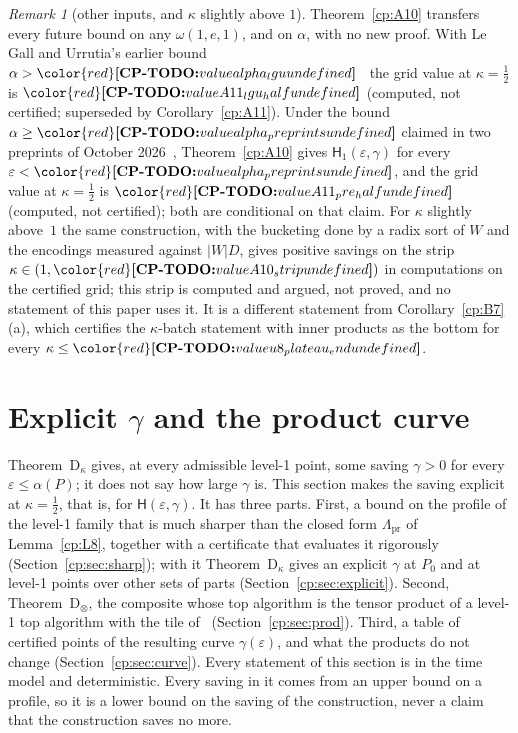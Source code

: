 \documentclass[11pt]{article}
\makeatletter
\theoremstyle{definition}
\theoremstyle{remark}
\newtheorem{remark}[theorem]{Remark}
\DeclareRobustCommand{\CPTODO}[1]{{\color{red}\textbf{[CP-TODO:} #1\textbf{]}}}
\providecommand{\eps}{\varepsilon}
\newcommand{\abs}[1]{\lvert #1\rvert}
\newcommand{\Hyp}{\mathsf{H}}                 %
\newcommand{\Hypk}[1]{\mathsf{H}_{#1}}        %
\newcommand{\Lampr}{\Lambda_{\mathrm{pr}}}    %
\newcommand{\ThmDk}{Theorem~D\texorpdfstring{\ensuremath{_\kappa}}{\_kappa}}     %
\newcommand{\ThmDprod}{Theorem~D\texorpdfstring{\ensuremath{_\otimes}}{\_x}}     %
\newcommand{\Pzero}{P_0}                      %
\newcommand{\cpv}[1]{\ifcsname cpv@#1\endcsname\csname cpv@#1\endcsname\else\CPTODO{value #1 undefined}\fi}
\makeatother
\begin{document}
\begin{remark}[other inputs, and $\kappa$ slightly above $1$]\label{cp:A11:rem}
Theorem~\ref{cp:A10} transfers every future bound on any $\omega(1,e,1)$, and on $\alpha$, with no new proof. With Le Gall and Urrutia's earlier bound $\alpha>\cpv{alpha_lgu}$~\cite{LGU18} the grid value at $\kappa=\frac12$ is $\cpv{A11_lgu_half}$ (computed, not certified; superseded by Corollary~\ref{cp:A11}). Under the bound $\alpha\ge\cpv{alpha_preprints}$ claimed in two preprints of October 2026~\cite{AvdBZ26,Uzn26}, Theorem~\ref{cp:A10} gives $\Hypk1(\eps,\gamma)$ for every $\eps<\cpv{alpha_preprints}$, and the grid value at $\kappa=\frac12$ is $\cpv{A11_pre_half}$ (computed, not certified); both are conditional on that claim. For $\kappa$ slightly above~$1$ the same construction, with the bucketing done by a radix sort of $W$ and the encodings measured against $\abs WD$, gives positive savings on the strip $\kappa\in(1,\cpv{A10_strip})$ in computations on the certified grid; this strip is computed and argued, not proved, and no statement of this paper uses it. It is a different statement from Corollary~\ref{cp:B7}(a), which certifies the $\kappa$-batch statement with inner products as the bottom for every $\kappa\le\cpv{u8_plateau_end}$.
\end{remark}

\section{Explicit \texorpdfstring{$\gamma$}{gamma} and the product curve}\label{cp:sec:gamma}

\ThmDk{} gives, at every admissible level-1 point, some saving $\gamma>0$ for every $\eps\le\alpha(P)$; it does not say how large $\gamma$ is. This section makes the saving explicit at $\kappa=\frac12$, that is, for $\Hyp(\eps,\gamma)$. It has three parts. First, a bound on the profile of the level-1 family that is much sharper than the closed form $\Lampr$ of Lemma~\ref{cp:L8}, together with a certificate that evaluates it rigorously (Section~\ref{cp:sec:sharp}); with it \ThmDk{} gives an explicit $\gamma$ at $\Pzero$ and at level-1 points over other sets of parts (Section~\ref{cp:sec:explicit}). Second, \ThmDprod{}, the composite whose top algorithm is the tensor product of a level-1 top algorithm with the tile of~\cite{v2} (Section~\ref{cp:sec:prod}). Third, a table of certified points of the resulting curve $\gamma(\eps)$, and what the products do not change (Section~\ref{cp:sec:curve}). Every statement of this section is in the time model and deterministic. Every saving in it comes from an upper bound on a profile, so it is a lower bound on the saving of the construction, never a claim that the construction saves no more.
\end{document}
